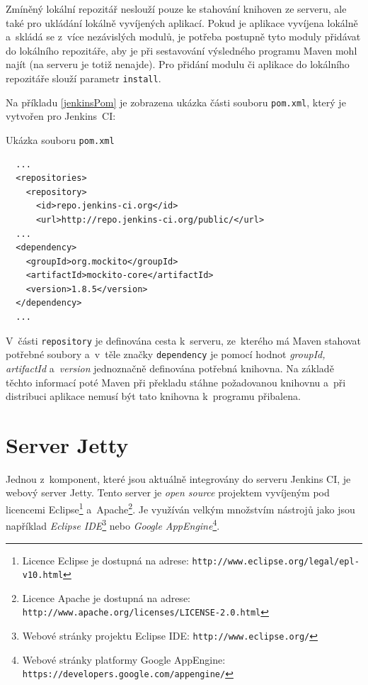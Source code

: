        Zmíněný lokální repozitář neslouží pouze ke stahování knihoven ze serveru, ale
        také pro ukládání lokálně vyvíjených aplikací.
        Pokud je aplikace vyvíjena lokálně a~skládá se z~více nezávislých modulů, je potřeba
        postupně tyto moduly přidávat do lokálního repozitáře, aby je při sestavování
        výsledného programu Maven mohl najít (na serveru je totiž nenajde). Pro přidání modulu či aplikace do 
        lokálního repozitáře slouží parametr \texttt{install}.


        Na příkladu \ref{jenkinsPom} je zobrazena ukázka části souboru \texttt{pom.xml}, který je vytvořen pro Jenkins~CI:
        
        \newpage
        \begin{priklad} \label{jenkinsPom} 
            Ukázka souboru \texttt{pom.xml}
\begin{verbatim}
  ...
  <repositories>
    <repository>
      <id>repo.jenkins-ci.org</id>
      <url>http://repo.jenkins-ci.org/public/</url>
  ...
  <dependency>
    <groupId>org.mockito</groupId>
    <artifactId>mockito-core</artifactId>
    <version>1.8.5</version>
  </dependency>
  ...
\end{verbatim}
        \end{priklad}

        V~části \texttt{repository} je definována cesta k~serveru, ze~kterého má Maven stahovat potřebné soubory
        a~v~těle značky \texttt{dependency} je pomocí hodnot \emph{groupId, artifactId} a~\emph{version} jednoznačně
        definována potřebná knihovna. Na základě těchto informací poté Maven při překladu stáhne požadovanou
        knihovnu a~při distribuci aplikace nemusí být tato knihovna k~programu přibalena. 


    \section{Server Jetty} \label{jetty}
        Jednou z~komponent, které jsou aktuálně integrovány do serveru Jenkins CI, je webový server Jetty.
        Tento server je \emph{open source} projektem vyvíjeným pod licencemi 
        Eclipse\footnote{Licence Eclipse je dostupná na adrese: \texttt{http://www.eclipse.org/legal/epl-v10.html}}
        a~Apache\footnote{Licence Apache je dostupná 
        na adrese: \texttt{http://www.apache.org/licenses/LICENSE-2.0.html}}. 
            Je využíván velkým množstvím nástrojů jako jsou například \emph{Eclipse IDE}\footnote{Webové stránky projektu Eclipse IDE:
        \texttt{http://www.eclipse.org/}} nebo \emph{Google AppEngine}\footnote{Webové stránky platformy Google AppEngine:
        \texttt{https://developers.google.com/appengine/}}.

